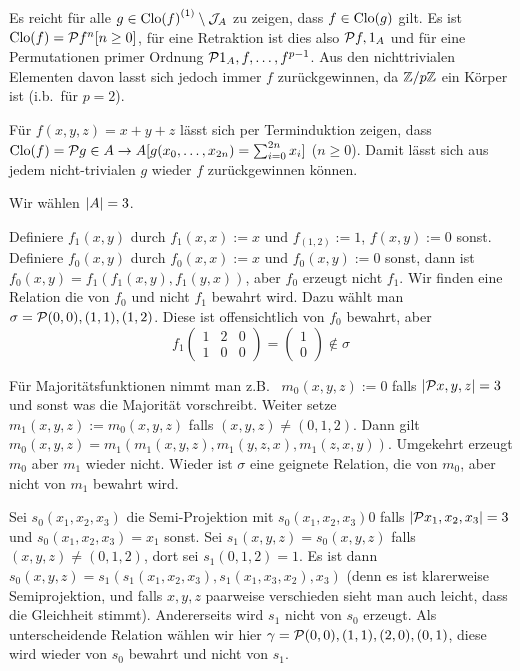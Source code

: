 \documentclass{book}
\begin{document}
\begin{solution}
    \begin{tasks}
            \item Es reicht für alle $g\in{\mathrm{Clo}(f)}^{(1)}\setminus\mathcal{J}_A$ zu zeigen, dass $f\in\mathrm{Clo}(g)$ gilt. Es ist $\Clo(f)=\set{f^n}[n\geq 0]$, für eine Retraktion ist dies also $\set{f,1_A}$ und für eine Permutationen primer Ordnung $\set{1_A,f,\ldots,f^{p-1}}$. Aus den nichttrivialen Elementen davon lasst sich jedoch immer $f$ zurückgewinnen, da $\mathbb{Z}/p\mathbb{Z}$ ein Körper ist (i.b.~für $p=2$).
            \item Für $f(x,y,z)=x+y+z$ lässt sich per Terminduktion zeigen, dass $\Clo(f)=\set{g\in A\to A}[g(x_0,\ldots,x_{2n})=\sum_{i=0}^{2n}x_i]$ ($n\geq 0$). Damit lässt sich aus jedem nicht-trivialen $g$ wieder $f$ zurückgewinnen können.
        \item Wir wählen $\left|A\right|=3$.
    \begin{tasks} 
            \item Definiere $f_1(x,y)$ durch $f_1(x,x):=x$ und $f_(1,2):=1$, $f(x,y):=0$ sonst. Definiere $f_0(x,y)$ durch $f_0(x,x):=x$ und $f_0(x,y):=0$ sonst, dann ist $f_0(x,y)=f_1(f_1(x,y),f_1(y,x))$, aber $f_0$ erzeugt nicht $f_1$. Wir finden eine Relation die von $f_0$ und nicht $f_1$ bewahrt wird. Dazu wählt man $\sigma=\set{(0,0),(1,1),(1,2)}$. Diese ist offensichtlich von $f_0$ bewahrt, aber
        $$
        f_1
        \begin{pmatrix}
            1 & 2 & 0 \\
            1 & 0 & 0
        \end{pmatrix}=
        \begin{pmatrix}
            1 \\
            0
        \end{pmatrix}\not\in\sigma
        $$
            \item Für Majoritätsfunktionen nimmt man z.B.~ $m_0(x,y,z):=0$ falls $\card{\set{x,y,z}}=3$ und sonst was die Majorität vorschreibt. Weiter setze $m_1(x,y,z):=m_0(x,y,z)$ falls $(x,y,z)\neq (0,1,2)$. Dann gilt $m_0(x,y,z)=m_1(m_1(x,y,z),m_1(y,z,x),m_1(z,x,y))$. Umgekehrt erzeugt $m_0$ aber $m_1$ wieder nicht. Wieder ist $\sigma$ eine geignete Relation, die von $m_0$, aber nicht von $m_1$ bewahrt wird.
            \item Sei $s_0(x_1,x_2,x_3)$ die Semi-Projektion mit $s_0(x_1,x_2,x_3)0$ falls $\card{\set{x_1,x_2,x_3}}=3$ und $s_0(x_1,x_2,x_3)=x_1$ sonst. Sei $s_1(x,y,z)=s_0(x,y,z)$ falls $(x,y,z)\neq(0,1,2)$, dort sei $s_1(0,1,2)=1$. Es ist dann $s_0(x,y,z)=s_1(s_1(x_1,x_2,x_3),s_1(x_1,x_3,x_2),x_3)$ (denn es ist klarerweise Semiprojektion, und falls $x,y,z$ paarweise verschieden sieht man auch leicht, dass die Gleichheit stimmt). Andererseits wird $s_1$ nicht von $s_0$ erzeugt.
        Als unterscheidende Relation wählen wir hier $\gamma=\set{(0,0),(1,1),(2,0),(0,1)}$, diese wird wieder von $s_0$ bewahrt und nicht von $s_1$.
    \end{tasks}
    \end{tasks}
\end{solution}
\end{document}

